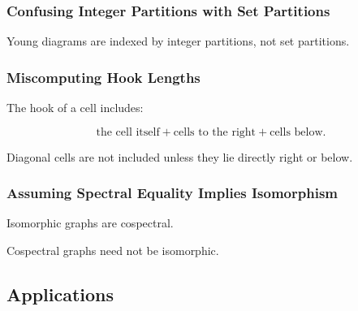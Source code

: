 \subsubsection{Confusing Integer Partitions with Set Partitions}

Young diagrams are indexed by integer partitions, not set partitions.

\subsubsection{Miscomputing Hook Lengths}

The hook of a cell includes:

\[
\boxed{
\text{the cell itself}
+
\text{cells to the right}
+
\text{cells below}.
}
\]

Diagonal cells are not included unless they lie directly right or below.

\subsubsection{Assuming Spectral Equality Implies Isomorphism}

Isomorphic graphs are cospectral.

Cospectral graphs need not be isomorphic.

\subsection{Applications}
\label{subsec:algebraic-combinatorics-applications}

